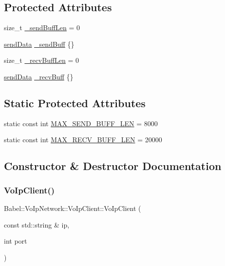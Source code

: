 \subsection*{Protected Attributes}
\begin{DoxyCompactItemize}
\item 
size\+\_\+t \hyperlink{classBabel_1_1VoIpNetwork_1_1VoIpClient_a17ffd7c249da536bf277e2dba4bda41b}{\+\_\+send\+Buff\+Len} = 0
\item 
\hyperlink{structsendData}{send\+Data} \hyperlink{classBabel_1_1VoIpNetwork_1_1VoIpClient_af5450afac47bf3c9096e769aee3d714f}{\+\_\+send\+Buff} \{\}
\item 
size\+\_\+t \hyperlink{classBabel_1_1VoIpNetwork_1_1VoIpClient_a0df6cd8820df05bc9188f8b21951030e}{\+\_\+recv\+Buff\+Len} = 0
\item 
\hyperlink{structsendData}{send\+Data} \hyperlink{classBabel_1_1VoIpNetwork_1_1VoIpClient_a3c9d4953044497cb8c06d74e90cb37ff}{\+\_\+recv\+Buff} \{\}
\end{DoxyCompactItemize}
\subsection*{Static Protected Attributes}
\begin{DoxyCompactItemize}
\item 
static const int \hyperlink{classBabel_1_1VoIpNetwork_1_1VoIpClient_a3ce6329bede722147d4e5ce8eedcdad7}{M\+A\+X\+\_\+\+S\+E\+N\+D\+\_\+\+B\+U\+F\+F\+\_\+\+L\+EN} = 8000
\item 
static const int \hyperlink{classBabel_1_1VoIpNetwork_1_1VoIpClient_a3b1f411e3b18c63c8f65dbc4e3f45358}{M\+A\+X\+\_\+\+R\+E\+C\+V\+\_\+\+B\+U\+F\+F\+\_\+\+L\+EN} = 20000
\end{DoxyCompactItemize}


\subsection{Constructor \& Destructor Documentation}
\mbox{\label{classBabel_1_1VoIpNetwork_1_1VoIpClient_aeab5520c1bdd081222c65ac24bae918b}} 
\subsubsection{\texorpdfstring{Vo\+Ip\+Client()}{VoIpClient()}}
{\footnotesize\ttfamily Babel\+::\+Vo\+Ip\+Network\+::\+Vo\+Ip\+Client\+::\+Vo\+Ip\+Client (\begin{DoxyParamCaption}\item[{const std\+::string \&}]{ip,  }\item[{int}]{port }\end{DoxyParamCaption})}

